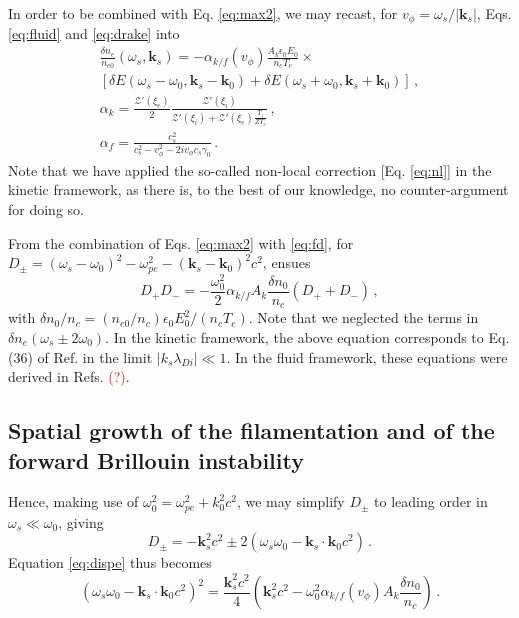 \documentclass[
 reprint,
 amsmath,amssymb,
 aps,
]{revtex4-1}
\begin{document}
In order to be combined with Eq. \eqref{eq:max2}, we may recast, for $v_\phi = \omega_s/\vert \mathbf{k}_s\vert $, Eqs. \eqref{eq:fluid} and  \eqref{eq:drake} into 
\begin{align}
   \frac{\delta n_e }{n_{e0}}(\omega_s,\mathbf{k}_s) = -\alpha_{k/f}(v_\phi) \frac{A_k\epsilon_0 E_0}{n_c T_e}\times \nonumber\\ \left[\delta E(\omega_s-\omega_0, \mathbf{k}_s-\mathbf{k}_0) +\delta E(\omega_s+\omega_0, \mathbf{k}_s+\mathbf{k}_0) \right] \, ,\label{eq:fd} \\
   \alpha_k  = \frac{\mathcal{Z}'( \xi_e) }{2}\frac{\mathcal{Z}'( \xi_i)   }{  \mathcal{Z}'( \xi_i) +\mathcal{Z}'( \xi_e)\frac{ T_i }{  ZT_e} }\, ,\label{eq:alphak} \\
   \alpha_f = \frac{c_s^2}{ c_s^2-v_\phi^2 -2iv_\phi c_s \gamma_0}\, .\label{eq:alphaf}
\end{align}
Note that we have  applied the so-called non-local correction [Eq. \eqref{eq:nl}] in the kinetic framework, as there is, to the best of our knowledge,  no counter-argument for doing so. 

From the combination of  Eqs. \eqref{eq:max2} with \eqref{eq:fd}, 
for $D_\pm= (\omega_s-\omega_0)^2 - \omega_{pe}^2 -( \mathbf{k}_s-\mathbf{k}_0) ^2c^2 $, ensues
\begin{equation}\label{eq:dispe}
    D_+D_- = -\frac{\omega_{0}^2}{2}\alpha_{k/f}A_k\frac{\delta n_0}{n_c} (D_++D_-) \, ,
\end{equation}
with $\delta n_0/n_c = (n_{e0}/n_c) \epsilon_0E_0^2/(n_c T_e)$.
Note that we neglected the terms in $\delta n_e(\omega_s \pm 2\omega_0)$.
In the kinetic framework, the above equation corresponds to Eq. (36) of Ref. \cite[]{POF_Cohen_79} in the limit $\vert k_s \lambda_{Di} \vert \ll 1$. In the fluid framework, these equations were derived in Refs. \cite[]{Kruer,phd_Michel,phd-Grech} \textcolor{red}{(?)}.

\subsection{Spatial growth of the filamentation and of the forward Brillouin instability}
Hence,  making use of $\omega_0^2=\omega_{pe}^2 +k_0^2c^2$, we may simplify $D_\pm$ to leading order in $\omega_s\ll\omega_0$, giving 
\begin{equation}\label{eq:dpm}
D_\pm = -\mathbf{k}_s^2c^2\pm 2(\omega_s\omega_0 - \mathbf{k}_s\cdot\mathbf{k}_0 c^2) \, .
\end{equation} 
Equation \eqref{eq:dispe} thus becomes 
\begin{equation}\label{eq:dispe2} 
(\omega_s\omega_0 - \mathbf{k}_s\cdot\mathbf{k}_0 c^2)^2
=\frac{\mathbf{k}_s^2c^2}{4}\left( \mathbf{k}_s^2c^2 - \omega_{0}^2\alpha_{k/f}(v_\phi)A_k\frac{\delta n_0}{n_c} \right) 
\, .
\end{equation}
\end{document}

